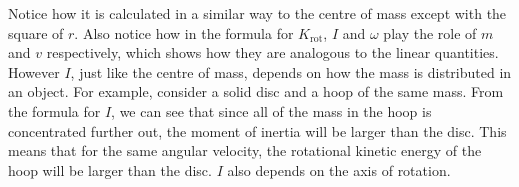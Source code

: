 \documentclass[../classical_mechanics.tex]{subfiles}
\begin{document}
        Notice how it is calculated in a similar way to the centre of mass except with the square of $r$.
        Also notice how in the formula for $K_\text{rot}$, $I$ and $\omega$ play the role of $m$ and $v$ respectively, which shows how they are analogous to the linear quantities.
        However $I$, just like the centre of mass, depends on how the mass is distributed in an object.
        For example, consider a solid disc and a hoop of the same mass.
        From the formula for $I$, we can see that since all of the mass in the hoop is concentrated further out, the moment of inertia will be larger than the disc.
        This means that for the same angular velocity, the rotational kinetic energy of the hoop will be larger than the disc.
        $I$ also depends on the axis of rotation.
\end{document}
